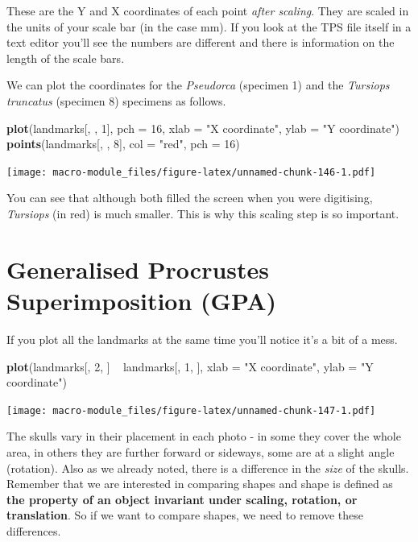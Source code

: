 \documentclass[]{book}
\newenvironment{Shaded}{\begin{snugshade}}{\end{snugshade}}
\newcommand{\KeywordTok}[1]{\textcolor[rgb]{0.13,0.29,0.53}{\textbf{{#1}}}}
\newcommand{\DataTypeTok}[1]{\textcolor[rgb]{0.13,0.29,0.53}{{#1}}}
\newcommand{\DecValTok}[1]{\textcolor[rgb]{0.00,0.00,0.81}{{#1}}}
\newcommand{\StringTok}[1]{\textcolor[rgb]{0.31,0.60,0.02}{{#1}}}
\newcommand{\NormalTok}[1]{{#1}}
\begin{document}
These are the Y and X coordinates of each point \emph{after scaling}.
They are scaled in the units of your scale bar (in the case mm). If you
look at the TPS file itself in a text editor you'll see the numbers are
different and there is information on the length of the scale bars.

We can plot the coordinates for the \emph{Pseudorca} (specimen 1) and
the \emph{Tursiops truncatus} (specimen 8) specimens as follows.

\begin{Shaded}
\begin{Highlighting}[]
\KeywordTok{plot}\NormalTok{(landmarks[, , }\DecValTok{1}\NormalTok{], }\DataTypeTok{pch =} \DecValTok{16}\NormalTok{, }\DataTypeTok{xlab =} \StringTok{"X coordinate"}\NormalTok{, }\DataTypeTok{ylab =} \StringTok{"Y coordinate"}\NormalTok{)}
\KeywordTok{points}\NormalTok{(landmarks[, , }\DecValTok{8}\NormalTok{], }\DataTypeTok{col =} \StringTok{"red"}\NormalTok{, }\DataTypeTok{pch =} \DecValTok{16}\NormalTok{)}
\end{Highlighting}
\end{Shaded}

\texttt{[image: macro-module\_files/figure-latex/unnamed-chunk-146-1.pdf]}

You can see that although both filled the screen when you were
digitising, \emph{Tursiops} (in red) is much smaller. This is why this
scaling step is so important.

\section{Generalised Procrustes Superimposition
(GPA)}\label{generalised-procrustes-superimposition-gpa}

If you plot all the landmarks at the same time you'll notice it's a bit
of a mess.

\begin{Shaded}
\begin{Highlighting}[]
\KeywordTok{plot}\NormalTok{(landmarks[, }\DecValTok{2}\NormalTok{, ] ~}\StringTok{ }\NormalTok{landmarks[, }\DecValTok{1}\NormalTok{, ], }\DataTypeTok{xlab =} \StringTok{"X coordinate"}\NormalTok{, }\DataTypeTok{ylab =} \StringTok{"Y coordinate"}\NormalTok{)}
\end{Highlighting}
\end{Shaded}

\texttt{[image: macro-module\_files/figure-latex/unnamed-chunk-147-1.pdf]}

The skulls vary in their placement in each photo - in some they cover
the whole area, in others they are further forward or sideways, some are
at a slight angle (rotation). Also as we already noted, there is a
difference in the \emph{size} of the skulls. Remember that we are
interested in comparing shapes and shape is defined as \textbf{the
property of an object invariant under scaling, rotation, or
translation}. So if we want to compare shapes, we need to remove these
differences.
\end{document}
